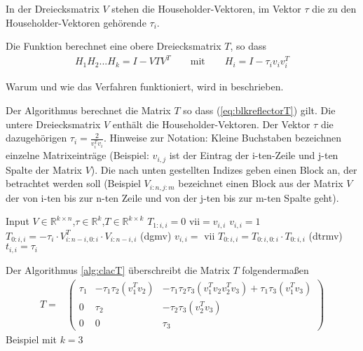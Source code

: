 In der Dreiecksmatrix $V$ stehen die Householder-Vektoren,
im Vektor $\tau$ die zu den Householder-Vektoren gehörende $\tau_i$.

Die Funktion berechnet eine obere Dreiecksmatrix $T$, so dass
\begin{align}
H_1H_2...H_k = I - VTV^T \qquad \text{mit}\qquad H_i = I - \tau_i v_iv_i^T
\label{eq:blkreflectorT}
\end{align}

Warum und wie das Verfahren funktioniert, wird in \cite{Joffrain:2006:AHT:1141885.1141886} beschrieben.



\begin{algorithm}[H]
\caption{Der Algorithmus berechnet die Matrix $T$ so dass  (\ref{eq:blkreflectorT}) gilt. Die untere Dreiecksmatrix $V$  enthält die Householder-Vektoren. Der Vektor $\tau$ die dazugehörigen $\tau_i = \frac{2}{v_i^Tv_i}$. Hinweise zur Notation: Kleine Buchstaben bezeichnen einzelne Matrixeinträge (Beispiel: $v_{i,j}$ ist der Eintrag der i-ten-Zeile und j-ten Spalte der Matrix $V$). Die nach unten gestellten Indizes geben einen Block an, der betrachtet werden soll (Beispiel $V_{i:n,j:m}$ bezeichnet einen Block aus der Matrix $V$ der von i-ten bis zur n-ten Zeile und von der j-ten bis zur m-ten Spalte geht).}
\label{alg:clacT}
\begin{algorithmic}[1]
\State Input $V \in \mathbb{R}^{k \times n}$,$\tau \in \mathbb{R}^k$,$T \in \mathbb{R}^{k \times k}$
		\State $T_{1:i,i}=0$
	\Else
		\State vii$ = v_{i,i}$
		\State $v_{i,i} = 1 $
		\State $T_{0:i,i} = - \tau_i \cdot V_{i:n-i,0:i}^T \cdot V_{i:n-i,i}$ (dgmv)
		\State $ v_{i,i} =$ vii 
		\State $T_{0:i,i} = T_{0:i,0:i} \cdot T_{0:i,i}$ (dtrmv)
		\State $t_{i,i} = \tau_i$
	\EndIf
\EndFor
\end{algorithmic}
\end{algorithm}

Der Algorithmus \ref{alg:clacT} überschreibt die Matrix $T$ folgendermaßen
\begin{align*}
T =&
\begin{pmatrix}
\tau_1 & -\tau_1 \tau_2 (v_1^T v_2 ) & - \tau_1 \tau_2  \tau_3 (v_1^T v_2 v_2^T v_3) + \tau_1 \tau_3  (v_1^T v_3)\\ 
0 & \tau_2 &  -\tau_2 \tau_3  (v_2^T v_3)\\
0 & 0 & \tau_3
\end{pmatrix}
\end{align*}
Beispiel mit $k=3$

